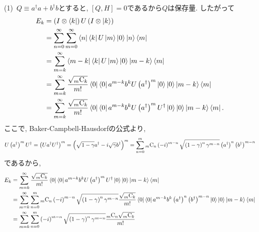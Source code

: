 \begin{ex}
    \label{ex8.21}
    (1)\
    $Q \equiv a^\dagger a + b^\dagger b$とすると, $\left[ Q, H\right] = 0$であるから$Q$は保存量. したがって
    \begin{align*}
        E_k
         & =
        \left( I \otimes \bra{k}\right) U \left( I \otimes \ket{k}\right)
        \\
         & =
        \sum_{n=0}^\infty \sum_{m=0}^\infty
        \bra{n}\bra{k} U \ket{m}\ket{0} \ket{n}\bra{m}
        \\
         & =
        \sum_{m=k}^\infty
        \bra{m-k}\bra{k} U \ket{m}\ket{0} \ket{m-k}\bra{m}
        \\
         & =
        \sum_{m=k}^\infty
        \frac{\sqrt{{}_{m}\text{C}_{k}}}{m!}
        \bra{0}\bra{0} a^{m-k} b^k U \left(a^\dagger\right)^m \ket{0}\ket{0}
        \ket{m-k}\bra{m}
        \\
        & =
       \sum_{m=k}^\infty
       \frac{\sqrt{{}_{m}\text{C}_{k}}}{m!}
       \bra{0}\bra{0} a^{m-k} b^k U \left(a^\dagger\right)^m U^\dagger \ket{0}\ket{0}
       \ket{m-k}\bra{m}
        .
    \end{align*}
    ここで, Baker-Campbell-Hausdorfの公式より,
    \begin{align*}
        U \left(a^\dagger\right)^m U^\dagger
        =
        \left(U a^\dagger U^\dagger\right)^m
        =
        \left( \sqrt{1-\gamma} a^\dagger - i \sqrt{\gamma} b^\dagger\right)^m
        =
        \sum_{n=0}^m {}_{m}\text{C}_{n} \left(-i\right)^{m-n} \sqrt{\left(1-\gamma\right)^n \gamma^{m-n}}
        \left( a^\dagger\right)^n \left(b^\dagger\right)^{m-n}
    \end{align*}
    であるから,
    \begin{align*}
        E_k
         & =
         \sum_{m=k}^\infty
         \frac{\sqrt{\comb{m}{k}}}{m!}
         \bra{0}\bra{0} a^{m-k} b^k U \left(a^\dagger\right)^m U^\dagger \ket{0}\ket{0}
         \ket{m-k}\bra{m}
        \\
         & =
        \sum_{m=k}^\infty
        \sum_{n=0}^m
        \comb{m}{n} \left(-i\right)^{m-n} \sqrt{\left(1-\gamma\right)^n \gamma^{m-n}}
        \frac{\sqrt{\comb{m}{k}}}{m!}
        \bra{0}\bra{0}
        a^{m-k} b^k \left( a^\dagger\right)^n \left(b^\dagger\right)^{m-n}
        \ket{0}\ket{0}
        \ket{m-k}\bra{m}
        \\
         & =
        \sum_{m=k}^\infty
        \sum_{n=0}^m
        \left(-i\right)^{m-n} \sqrt{\left(1-\gamma\right)^n \gamma^{m-n}}
        \frac{\comb{m}{n} \sqrt{\comb{m}{k}}}{m!}

\end{align*}
\end{ex}
